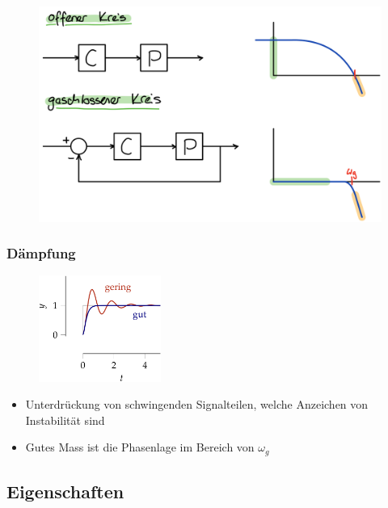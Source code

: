 \documentclass[
  10pt,
  a4paper,
  twocolumn]{article}
\providecommand{\tightlist}{%
  \setlength{\itemsep}{0pt}\setlength{\parskip}{0pt}}\usepackage{longtable,booktabs,array}
\numberwithin{equation}{section}
\begin{document}
\begin{figure}[H]

{\centering \includegraphics{images/paste-15.png}

}

\end{figure}

\hypertarget{duxe4mpfung}{%
\subsubsection{Dämpfung}\label{duxe4mpfung}}

\begin{figure}[H]

{\centering \includegraphics[width=4cm,height=\textheight]{images/paste-14.png}

}

\end{figure}

\begin{itemize}
\tightlist
\item
  Unterdrückung von schwingenden Signalteilen, welche Anzeichen von
  Instabilität sind
\item
  Gutes Mass ist die Phasenlage im Bereich von \(\omega_g\)
\end{itemize}

\hypertarget{eigenschaften}{%
\subsection{Eigenschaften}\label{eigenschaften}}
\end{document}
